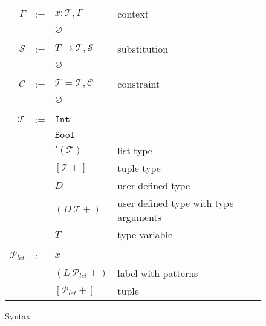 \documentclass{article}
\begin{document}
\begin{figure}[tb]
    \centering
    \begin{tabular}{rrll}
    $\Gamma$ & :=  & $x : \mathcal{T}, \Gamma$ & context\\
        & $|$ & $\varnothing$ \\ \\

    $\mathcal{S}$ & :=  & $T \rightarrow \mathcal{T}, \mathcal{S}$ & substitution \\
        & $|$ & $\varnothing$ \\ \\

    $\mathcal{C}$ & :=  & $\mathcal{T} = \mathcal{T}, \mathcal{C}$ & constraint \\
        & $|$ & $\varnothing$ \\ \\

    $\mathcal{T}$ & :=  & $\mathtt{Int}$ \\
        & $|$ & $\mathtt{Bool}$ \\
        & $|$ & $'(\mathcal{T})$ & list type \\
        & $|$ & $[\mathcal{T}+]$ & tuple type \\
        & $|$ & $D$    & user defined type \\
        & $|$ & $(D\ \mathcal{T}+)$ & user defined type with type arguments \\
        & $|$ & $T$ & type variable \\ \\

    $\mathcal{P}_{let}$ & :=  & $x$ \\
        & $|$ & $(L\ \mathcal{P}_{let}+)$ & label with patterns \\
        & $|$ & $[\mathcal{P}_{let}+]$ & tuple \\
    \end{tabular}
    \caption{Syntax}
\end{figure}
\end{document}
